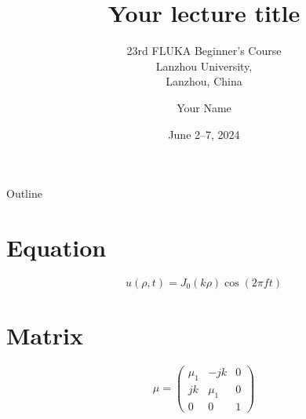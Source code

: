 \documentclass[aspectratio=169]{beamer}
\title{Your lecture title}
\subtitle{23rd FLUKA Beginner's Course \\ Lanzhou University, \\ Lanzhou, China}
\date{June 2--7, 2024}
\author{Your Name}
\institute[Your Short Institute]{Your Full Institute}
\begin{document}
\begin{frame}[plain]
\maketitle
\end{frame}

\begin{frame}{Outline}
\tableofcontents
\end{frame}

 \section{Equation}
 \begin{frame}{\secname}
   \centering
   \Huge
   $$
   u(\rho,t) = J_0(k\rho) \cos(2\pi f t)
   $$
 \end{frame}

 \section{Matrix}
 \begin{frame}{\secname}
   \centering
   \Huge
   $$
   \mu = \left(
     \begin{array}{ccc}
       \mu_{1} & -jk & 0 \\
       jk & \mu_{1} & 0 \\
       0 & 0 & 1
     \end{array}
   \right)
   $$
 \end{frame}
\end{document}
